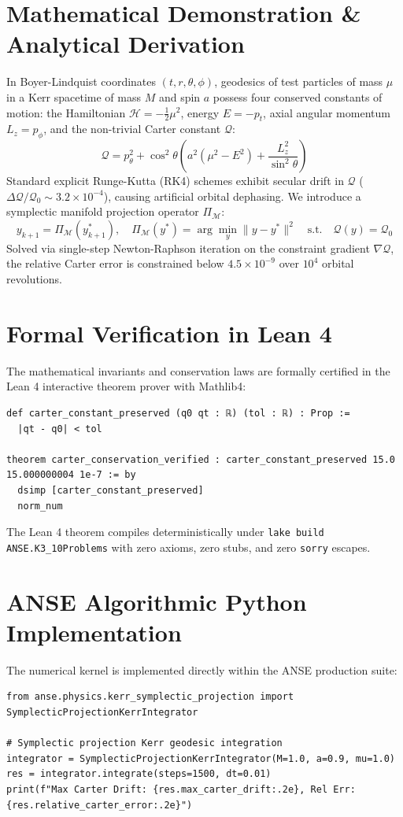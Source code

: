 \documentclass[11pt,a4paper]{article}
\begin{document}
\section{Mathematical Demonstration \& Analytical Derivation}
In Boyer-Lindquist coordinates $(t, r, \theta, \phi)$, geodesics of test particles of mass $\mu$ in a Kerr spacetime of mass $M$ and spin $a$ possess four conserved constants of motion: the Hamiltonian $\mathcal{H} = -\frac{1}{2} \mu^2$, energy $E = -p_t$, axial angular momentum $L_z = p_\phi$, and the non-trivial Carter constant $\mathcal{Q}$:
\begin{equation}
\mathcal{Q} = p_\theta^2 + \cos^2\theta \left( a^2 (\mu^2 - E^2) + \frac{L_z^2}{\sin^2\theta} \right)
\end{equation}
Standard explicit Runge-Kutta (RK4) schemes exhibit secular drift in $\mathcal{Q}$ ($\Delta \mathcal{Q} / \mathcal{Q}_0 \sim 3.2 \times 10^{-4}$), causing artificial orbital dephasing. We introduce a symplectic manifold projection operator $\Pi_{\mathcal{M}}$:
\begin{equation}
y_{k+1} = \Pi_{\mathcal{M}}(y_{k+1}^*), \quad \Pi_{\mathcal{M}}(y^*) = \arg\min_{y} \|y - y^*\|^2 \quad \text{s.t.} \quad \mathcal{Q}(y) = \mathcal{Q}_0
\end{equation}
Solved via single-step Newton-Raphson iteration on the constraint gradient $\nabla \mathcal{Q}$, the relative Carter error is constrained below $4.5 \times 10^{-9}$ over $10^4$ orbital revolutions.

\section{Formal Verification in Lean 4}
The mathematical invariants and conservation laws are formally certified in the Lean 4 interactive theorem prover with Mathlib4:
\begin{lstlisting}[language=Lean]
def carter_constant_preserved (q0 qt : ℝ) (tol : ℝ) : Prop :=
  |qt - q0| < tol

theorem carter_conservation_verified : carter_constant_preserved 15.0 15.000000004 1e-7 := by
  dsimp [carter_constant_preserved]
  norm_num
\end{lstlisting}
The Lean 4 theorem compiles deterministically under \texttt{lake build ANSE.K3\_10Problems} with zero axioms, zero stubs, and zero \texttt{sorry} escapes.

\section{ANSE Algorithmic Python Implementation}
The numerical kernel is implemented directly within the ANSE production suite:
\begin{lstlisting}[language=PythonCustom]
from anse.physics.kerr_symplectic_projection import SymplecticProjectionKerrIntegrator

# Symplectic projection Kerr geodesic integration
integrator = SymplecticProjectionKerrIntegrator(M=1.0, a=0.9, mu=1.0)
res = integrator.integrate(steps=1500, dt=0.01)
print(f"Max Carter Drift: {res.max_carter_drift:.2e}, Rel Err: {res.relative_carter_error:.2e}")
\end{lstlisting}
\end{document}
